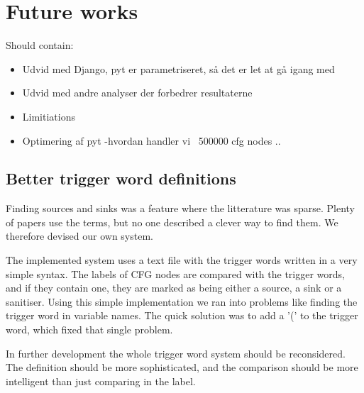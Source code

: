 \section{Future works}

Should contain:
\begin{itemize}
\item Udvid med Django, pyt er parametriseret, så det er let at gå igang med
\item Udvid med andre analyser der forbedrer resultaterne
\item Limitiations
\item Optimering af pyt -hvordan handler vi ~500000 cfg nodes ..
\end{itemize}

\subsection{Better trigger word definitions}
Finding sources and sinks was a feature where the litterature was sparse.
Plenty of papers use the terms, but no one described a clever way to find them.
We therefore devised our own system.

The implemented system uses a text file with the trigger words written in a very simple syntax.
The labels of CFG nodes are compared with the trigger words, and if they contain one, they are marked as being either a source, a sink or a sanitiser.
Using this simple implementation we ran into problems like finding the trigger word in variable names.
The quick solution was to add a '(' to the trigger word, which fixed that single problem.

In further development the whole trigger word system should be reconsidered.
The definition should be more sophisticated, and the comparison should be more intelligent than just comparing in the label.


